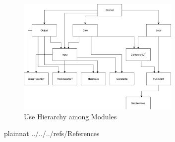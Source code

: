 \documentclass[12pt]{article}
\begin{document}
\begin{figure}[H]
	\centering
	\includegraphics[width=0.7\textwidth]{GlassBR-UsesHierarchy.pdf}
	\caption{Use Hierarchy among Modules}
	\label{FigUH}
\end{figure}


 {plainnat}
 {../../../refs/References}
\end{document}
